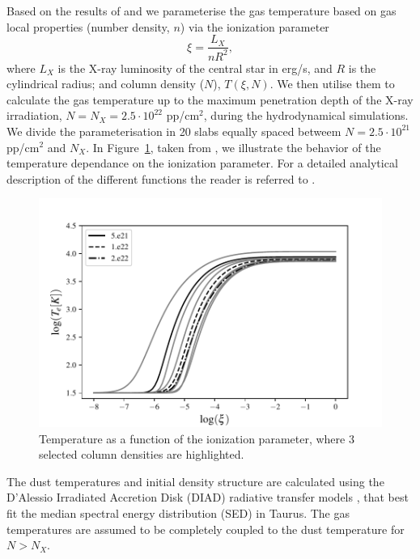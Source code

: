 \documentclass{aa}
\begin{document}
Based on the results of  and  we parameterise the gas temperature based on gas local properties (number density, $n$) via the ionization parameter
\begin{equation}
    \xi = \frac{L_X}{n R^2},
\end{equation}
where $L_X$ is the X-ray luminosity of the central star in erg/s, and $R$ is the cylindrical radius; and column density ($N$), $T(\xi,N)$.
We then utilise them to calculate the gas temperature up to the maximum penetration depth of the X-ray irradiation, $N = N_X = 2.5\cdot 10^{22}$ pp/cm$^2$, during the hydrodynamical simulations.
We divide the parameterisation in 20 slabs equally spaced betweem $N=2.5\cdot 10^{21}$ pp/cm$^2$ and $N_X$. In Figure~\ref{fig:tempxi}, taken from , we illustrate the behavior of the temperature dependance on the ionization parameter. For a detailed analytical description of the different functions the reader is referred to .

\begin{figure}
    \centering
    \includegraphics[width=.45\textwidth]{Fig1}
    \caption{Temperature as a function of the ionization parameter, where $3$ selected column densities are highlighted. \label{fig:tempxi}}
\end{figure}

The dust temperatures and initial density structure are calculated using the D’Alessio
Irradiated Accretion Disk (\textsc{DIAD}) radiative transfer models , that best fit the median spectral energy distribution (SED) in Taurus.
The gas temperatures are assumed to be completely coupled to the dust temperature for $N>N_X$.
\end{document}
